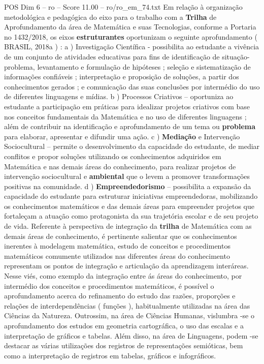\begin{textsample}{POS Dim 6 – ro – Score 11.00 – ro/ro\_em\_74.txt}
Em relação à organização metodológica e pedagógica do eixo para o trabalho com a \textbf{Trilha} de Aprofundamento da área de Matemática e suas Tecnologias, conforme a Portaria no 1432/2018, os eixos \textbf{estruturantes} oportunizam o seguinte aprofundamento ( BRASIL, 2018a ) : a ) Investigação Científica - possibilita ao estudante a vivência de um conjunto de atividades educativas para fins de identificação de situação-problema, levantamento e formulação de hipóteses ; seleção e sistematização de informações confiáveis ; interpretação e proposição de soluções, a partir dos conhecimentos gerados ; e comunicação das suas conclusões por intermédio do uso de diferentes linguagens e mídias. b ) Processos Criativos – oportuniza ao estudante a participação em práticas para idealizar projetos criativos com base nos conceitos fundamentais da Matemática e no uso de diferentes linguagens ; além de contribuir na identificação e aprofundamento de um tema ou \textbf{problema} para elaborar, apresentar e difundir uma ação. c ) \textbf{Mediação} e Intervenção Sociocultural – permite o desenvolvimento da capacidade do estudante, de mediar conflitos e propor soluções utilizando os conhecimentos adquiridos em Matemática e nas demais áreas do conhecimento, para realizar projetos de intervenção sociocultural e \textbf{ambiental} que o levem a promover transformações positivas na comunidade. d ) \textbf{Empreendedorismo} – possibilita a expansão da capacidade do estudante para estruturar iniciativas empreendedoras, mobilizando os conhecimentos matemáticos e das demais áreas para empreender projetos que fortaleçam a atuação como protagonista da sua trajetória escolar e de seu projeto de vida.
Referente à perspectiva de integração da \textbf{trilha} de Matemática com as demais áreas de conhecimento, é pertinente salientar que os conhecimentos inerentes à modelagem matemática, estudo de conceitos e procedimentos matemáticos comumente utilizados nas diferentes áreas do conhecimento representam os pontos de integração e articulação da aprendizagem interáreas.
Nesse viés, como exemplo da integração entre ás áreas do conhecimento, por intermédio dos conceitos e procedimentos matemáticos, é possível o aprofundamento acerca do refinamento do estudo das razões, proporções e relações de interdependências ( funções ), habitualmente utilizadas na área das Ciências da Natureza.
Outrossim, na área de Ciências Humanas, vislumbra -se o aprofundamento dos estudos em geometria cartográfica, o uso das escalas e a interpretação de gráficos e tabelas.
Além disso, na área de Linguagens, podem -se destacar as várias utilizações dos registros de representações semióticas, bem como a interpretação de registros em tabelas, gráficos e infográficos.

\end{textsample}
